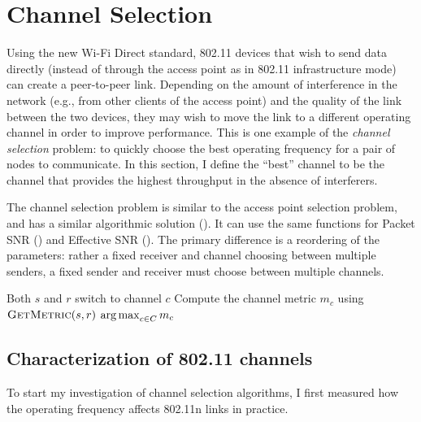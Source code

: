 \section{Channel Selection}\label{sec:esnr_chansel}
Using the new Wi-Fi Direct standard, 802.11 devices that wish to send data directly (instead of through the access point as in 802.11 infrastructure mode) can create a peer-to-peer link. Depending on the amount of interference in the network (e.g., from other clients of the access point) and the quality of the link between the two devices, they may wish to move the link to a different operating channel in order to improve performance. This is one example of the \emph{channel selection} problem: to quickly choose the best operating frequency for a pair of nodes to communicate. In this section, I define the ``best'' channel to be the channel that provides the highest throughput in the absence of interferers.

The channel selection problem is similar to the access point selection problem, and has a similar algorithmic solution (). It can use the same  functions for Packet SNR () and Effective SNR (). The primary difference is a reordering of the parameters: rather a fixed receiver and channel choosing between multiple senders, a fixed sender and receiver must choose between multiple channels.

\begin{algorithm}[thp]
\caption{\label{alg:chan_sel_basic}}
\begin{algorithmic}[1]
\STATE Both $s$ and $r$ switch to channel $c$
\STATE Compute the channel metric $m_c$ using $\textsc{GetMetric}(s,r)$
\ENDFOR
\RETURN $\operatorname*{arg\,max}_{c\in C} m_c$ \hfill {}
\end{algorithmic}
\end{algorithm}

\subsection{Characterization of 802.11 channels}
To start my investigation of channel selection algorithms, I first measured how the operating frequency affects 802.11n links in practice.

